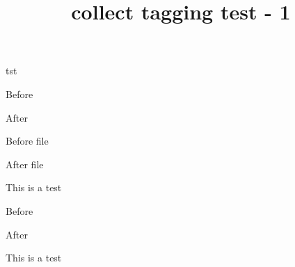 \documentclass{report}
\title{collect tagging test - 1}
\begin{document}

\begin{collect*}{tst}{Before\par}{\par After}{Before file\par}{\par After file}
This is a test
\end{collect*}


\begin{collectinmacro}{\collectedtext}{Before\par}{\par After}
This is a test
\end{collectinmacro}

\collectedtext
\end{document}
